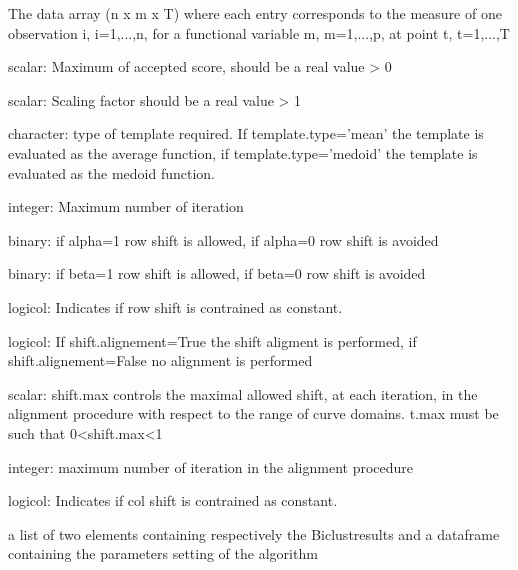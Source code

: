 \documentclass[a4paper]{book}
\begin{document}
\begin{Arguments}
\begin{ldescription}
\item[\code{fun\_mat}] The data array (n x m x T) where each entry corresponds to the measure of one observation i, i=1,...,n, for a functional variable m, m=1,...,p, at point t, t=1,...,T

\item[\code{delta}] scalar: Maximum of accepted score, should be a real value > 0

\item[\code{theta}] scalar: Scaling factor should be a real value > 1

\item[\code{template.type}] character: type of template required. If template.type='mean' the template is evaluated as the average function, if template.type='medoid' the template is evaluated as the medoid function.

\item[\code{number}] integer: Maximum number of iteration

\item[\code{alpha}] binary: if alpha=1 row shift is allowed, if alpha=0 row shift is avoided

\item[\code{beta}] binary: if beta=1 row shift is allowed, if beta=0 row shift is avoided

\item[\code{const\_alpha}] logicol: Indicates if row shift is contrained as constant.

\item[\code{shift.alignement}] logicol: If shift.alignement=True the shift aligment is performed, if shift.alignement=False no alignment is performed

\item[\code{shift.max}] scalar: shift.max controls the maximal allowed shift, at each iteration, in the alignment procedure with respect to the range of curve domains. t.max must be such that 0<shift.max<1

\item[\code{max.iter.align}] integer: maximum number of iteration in the alignment procedure

\item[\code{const\_b}] logicol: Indicates if col shift is contrained as constant.
\end{ldescription}
\end{Arguments}
%
\begin{Value}
a list of two elements containing respectively the Biclustresults and a dataframe containing the parameters setting of the algorithm
\end{Value}
\end{document}
